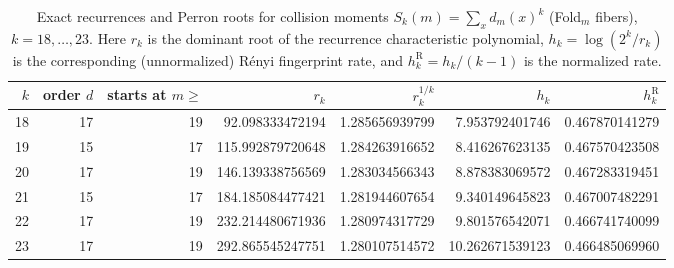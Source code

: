 \begin{table}[H]
\centering
\scriptsize
\setlength{\tabcolsep}{6pt}
\caption{Exact recurrences and Perron roots for collision moments $S_k(m)=\sum_x d_m(x)^k$ (Fold$_m$ fibers), $k=18,\dots,23$. Here $r_k$ is the dominant root of the recurrence characteristic polynomial, $h_k=\log(2^k/r_k)$ is the corresponding (unnormalized) R\'enyi fingerprint rate, and $h_k^{\mathrm R}=h_k/(k-1)$ is the normalized rate.}
\label{tab:fold_collision_moment_spectrum_k18_23}
\begin{tabular}{r r r r r r r}
\toprule
$k$ & order $d$ & starts at $m\ge$ & $r_k$ & $r_k^{1/k}$ & $h_k$ & $h_k^{\mathrm R}$\\
\midrule
18 & 17 & 19 & 92.098333472194 & 1.285656939799 & 7.953792401746 & 0.467870141279\\
19 & 15 & 17 & 115.992879720648 & 1.284263916652 & 8.416267623135 & 0.467570423508\\
20 & 17 & 19 & 146.139338756569 & 1.283034566343 & 8.878383069572 & 0.467283319451\\
21 & 15 & 17 & 184.185084477421 & 1.281944607654 & 9.340149645823 & 0.467007482291\\
22 & 17 & 19 & 232.214480671936 & 1.280974317729 & 9.801576542071 & 0.466741740099\\
23 & 17 & 19 & 292.865545247751 & 1.280107514572 & 10.262671539123 & 0.466485069960\\
\bottomrule
\end{tabular}
\end{table}
